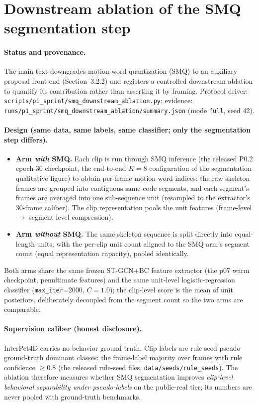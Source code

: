\documentclass[11pt,a4paper]{article}
\begin{document}
\section{Downstream ablation of the SMQ segmentation step}\label{app:smq}

\paragraph{Status and provenance.}
\begingroup\sloppy The main text down\-grades motion-word quan\-tization (SMQ) \citep{gokay2025smq} to an auxiliary proposal front-end (Section~3.2.2) and registers a controlled downstream ablation to quantify its contribution rather than asserting it by framing. Protocol driver: \texttt{scripts/p1\_sprint/smq\_downstream\_ablation.py}; evidence: \texttt{runs/p1\_sprint/smq\_downstream\_ablation/summary.json} (mode \texttt{full}, seed 42).
\endgroup
\paragraph{Design (same data, same labels, same classifier; only the segmentation step differs).}
\begin{itemize}
\item \textbf{Arm \emph{with} SMQ.} Each clip is run through SMQ inference (the released P0.2 epoch-30 checkpoint, the end-to-end $K{=}8$ configuration of the segmentation qualitative figure) to obtain per-frame motion-word indices; the raw skeleton frames are grouped into contiguous same-code segments, and each segment's frames are averaged into one sub-sequence unit (resampled to the extractor's 30-frame caliber). The clip representation pools the unit features (frame-level $\to$ segment-level compression).
\item \textbf{Arm \emph{without} SMQ.} The same skeleton sequence is split directly into equal-length units, with the per-clip unit count aligned to the SMQ arm's segment count (equal representation capacity), pooled identically.
\end{itemize}
Both arms share the same frozen ST-GCN+BC feature extractor (the p07 warm checkpoint, penultimate features) and the same unit-level logistic-regression classifier (\texttt{max\_iter}=2000, $C{=}1.0$); the clip-level score is the mean of unit posteriors, deliberately decoupled from the segment count so the two arms are comparable.

\paragraph{Supervision caliber (honest disclosure).}
InterPet4D carries no behavior ground truth. Clip labels are rule-seed pseudo-ground-truth dominant classes: the frame-label majority over frames with rule confidence $\geq 0.8$ (the released rule-seed files, \texttt{data/seeds/rule\_seeds}). The ablation therefore measures whether SMQ segmentation improves \emph{clip-level behavioral separability under pseudo-labels} on the public-real tier; its numbers are never pooled with ground-truth benchmarks.
\end{document}
